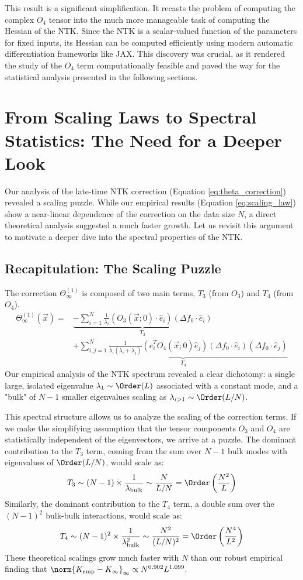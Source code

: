 \documentclass[a4paper]{article}
\begin{document}
This result is a significant simplification. It recasts the problem of computing the complex $O_4$ tensor into the much more manageable task of computing the Hessian of the NTK. Since the NTK is a scalar-valued function of the parameters for fixed inputs, its Hessian can be computed efficiently using modern automatic differentiation frameworks like JAX. This discovery was crucial, as it rendered the study of the $O_4$ term computationally feasible and paved the way for the statistical analysis presented in the following sections.

\newpage
\section{From Scaling Laws to Spectral Statistics: The Need for a Deeper Look}

Our analysis of the late-time NTK correction (Equation \ref{eq:theta_correction}) revealed a scaling puzzle. While our empirical results (Equation \ref{eq:scaling_law}) show a near-linear dependence of the correction on the data size $N$, a direct theoretical analysis suggested a much faster growth. Let us revisit this argument to motivate a deeper dive into the spectral properties of the NTK.

\subsection{Recapitulation: The Scaling Puzzle}
The correction $\Theta^{(1)}_\infty$ is composed of two main terms, $T_3$ (from $O_3$) and $T_4$ (from $O_4$).
\begin{align*}
\Theta^{(1)}_\infty(\vec{x}) = & \underbrace{-\sum_{i=1}^N \frac{1}{\lambda_{i}}(O_{3}(\vec{x};0)\cdot\hat{e}_{i})(\Delta f_{0}\cdot\hat{e}_{i})}_{T_3} \\
& + \underbrace{\sum_{i,j=1}^N\frac{1}{\lambda_{i}(\lambda_{i}+\lambda_{j})}(\hat{e}_{i}^{T}O_{4}(\vec{x};0)\hat{e}_{j})(\Delta f_{0}\cdot \hat{e}_{i})(\Delta f_{0}\cdot \hat{e}_{j})}_{T_4}
\end{align*}
Our empirical analysis of the NTK spectrum revealed a clear dichotomy: a single large, isolated eigenvalue $\lambda_1 \sim \Order(L)$ associated with a constant mode, and a "bulk" of $N-1$ smaller eigenvalues scaling as $\lambda_{i>1} \sim \Order(L/N)$.

This spectral structure allows us to analyze the scaling of the correction terms. If we make the simplifying assumption that the tensor components $O_3$ and $O_4$ are statistically independent of the eigenvectors, we arrive at a puzzle. The dominant contribution to the $T_3$ term, coming from the sum over $N-1$ bulk modes with eigenvalues of $\Order(L/N)$, would scale as:
\[ T_3 \sim (N-1) \times \frac{1}{\lambda_{\text{bulk}}} \sim \frac{N}{L/N} = \Order\left(\frac{N^2}{L}\right) \]
Similarly, the dominant contribution to the $T_4$ term, a double sum over the $(N-1)^2$ bulk-bulk interactions, would scale as:
\[ T_4 \sim (N-1)^2 \times \frac{1}{\lambda_{\text{bulk}}^2} \sim \frac{N^2}{(L/N)^2} = \Order\left(\frac{N^4}{L^2}\right) \]
These theoretical scalings grow much faster with $N$ than our robust empirical finding that $\norm{K_{\text{emp}} - K_{\infty}}_\infty \propto N^{0.902} L^{1.099}$.
\end{document}
